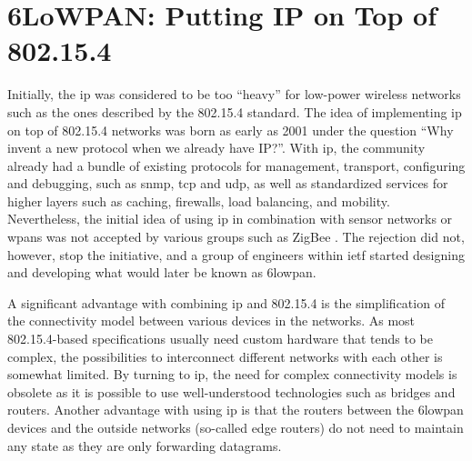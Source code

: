 






\section{6LoWPAN: Putting IP on Top of 802.15.4}
\label{sec:6lowpan}


Initially, the \gls{ip} was considered to be too ``heavy'' for low-power wireless networks such as the ones described by the 802.15.4 standard. The idea of implementing \gls{ip} on top of 802.15.4 networks was born as early as 2001 under the question ``Why invent a new protocol when we already have IP?''\cite{Mulligan2007}. With \gls{ip}, the community already had a bundle of existing protocols for management, transport, configuring and debugging, such as \gls{snmp}, \gls{tcp} and \gls{udp}, as well as standardized services for higher layers such as caching, firewalls, load balancing, and mobility. Nevertheless, the initial idea of using \gls{ip} in combination with sensor networks or \gls{wpan}s was not accepted by various groups such as ZigBee \cite{Mulligan2007}. The rejection did not, however, stop the initiative, and a group of engineers within \gls{ietf} started designing and developing what would later be known as \gls{6lowpan}.

A significant advantage with combining \gls{ip} and 802.15.4 is the simplification of the connectivity model between various devices in the networks. As most 802.15.4-based specifications usually need custom hardware that tends to be complex, the possibilities to interconnect different networks with each other is somewhat limited. By turning to \gls{ip}, the need for complex connectivity models is obsolete as it is possible to use well-understood technologies such as bridges and routers. Another advantage with using \gls{ip} is that the routers between the \gls{6lowpan} devices and the outside networks (so-called edge routers) do not need to maintain any state as they are only forwarding datagrams.

